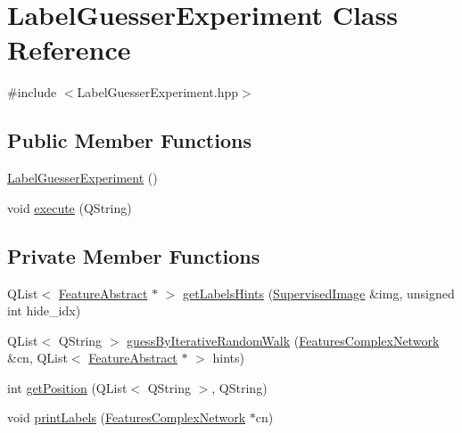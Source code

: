 \hypertarget{class_label_guesser_experiment}{\section{Label\+Guesser\+Experiment Class Reference}
\label{class_label_guesser_experiment}
}


{\ttfamily \#include $<$Label\+Guesser\+Experiment.\+hpp$>$}

\subsection*{Public Member Functions}
\begin{DoxyCompactItemize}
\item 
\hyperlink{class_label_guesser_experiment_a7977b88b6e11448ed975f4b9cea368dc}{Label\+Guesser\+Experiment} ()
\item 
void \hyperlink{class_label_guesser_experiment_a6fef3579411d12ac3bfa27f7cff5e71c}{execute} (Q\+String)
\end{DoxyCompactItemize}
\subsection*{Private Member Functions}
\begin{DoxyCompactItemize}
\item 
Q\+List$<$ \hyperlink{class_feature_abstract}{Feature\+Abstract} $\ast$ $>$ \hyperlink{class_label_guesser_experiment_a40090d4bc57138879aef276e4b77cd15}{get\+Labels\+Hints} (\hyperlink{class_supervised_image}{Supervised\+Image} \&img, unsigned int hide\+\_\+idx)
\item 
Q\+List$<$ Q\+String $>$ \hyperlink{class_label_guesser_experiment_a5d44dce75f708a361446e8c87545d198}{guess\+By\+Iterative\+Random\+Walk} (\hyperlink{class_features_complex_network}{Features\+Complex\+Network} \&cn, Q\+List$<$ \hyperlink{class_feature_abstract}{Feature\+Abstract} $\ast$ $>$ hints)
\item 
int \hyperlink{class_label_guesser_experiment_ae0a57bb59569d9bc69363a68f888f646}{get\+Position} (Q\+List$<$ Q\+String $>$, Q\+String)
\item 
void \hyperlink{class_label_guesser_experiment_a835363da6b06ec1402823493ef933179}{print\+Labels} (\hyperlink{class_features_complex_network}{Features\+Complex\+Network} $\ast$cn)
\end{DoxyCompactItemize}


